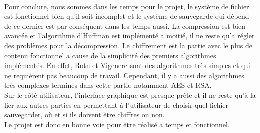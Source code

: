 \paragraph*{}
Pour conclure, nous sommes dans les temps pour le projet, le système de fichier est fonctionnel bien qu'il soit incomplet et le système de sauvegarde qui dépend de ce dernier est par conséquent dans les temps aussi. La compression est bien avancée et l'algorithme d'Huffman est implémenté a moitié, il ne reste qu'a régler des problèmes pour la décompression. Le chiffrement est la partie avec le plus de contenu fonctionnel a cause de la simplicité des premiers algorithmes implémentés. En effet, Rotn et Vigenere sont des algorithmes très simples et qui ne requièrent pas beaucoup de travail. Cependant, il y a aussi des algorithmes très complexes termines dans cette partie notamment AES et RSA.\\
Sur le côté utilisateur, l'interface graphique est presque prête et il ne reste qu'à la lier aux autres parties en permettant à l'utilisateur de choisir quel fichier sauvegarder, où et si ils doivent être chiffres ou non.\\
Le projet est donc en bonne voie pour être réalisé a temps et fonctionnel.
